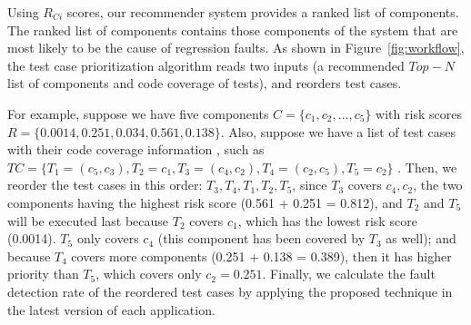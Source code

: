 Using $R_{Ci}$ scores, our recommender system provides a ranked list of components.
The ranked list of components contains those components of the system that are most
likely to be the cause of regression faults. 
As shown in Figure~\ref{fig:workflow}, the test case prioritization algorithm
reads two inputs (a recommended $Top-N$ list of components and code coverage of tests),
and reorders test cases. 

For example, suppose we have five components
$C =\{c_1, c_2, ... , c_5\}$ with risk scores 
$R =\{0.0014, 0.251, 0.034 , 0.561, 0.138\}$.
Also, suppose we have a list of test cases with their code coverage information
, such as $TC =\{T_1 ={(c_5, c_3)}, T_2={c_1}, T_3={(c_4, c_2)}, T_4={(c_2,c_5)} , T_5={c_2}\}$ .
Then, we reorder the test cases in this order:
$T_3, T_4, T_1, T_2, T_5$, 
since $T_3$ covers $c_4, c_2$, the two components 
having the highest risk score (0.561 + 0.251 = 0.812), and $T_2$ and $T_5$ will be
executed last because $T_2$ covers $c_1$, which has the lowest risk score (0.0014).
$T_5$ only covers $c_4$ (this component has been covered by $T_3$ as well); and because 
$T_4$  covers more components (0.251 + 0.138 = 0.389), then it has higher priority than 
$T_5$, which covers only $c_2 = 0.251$.
Finally, we calculate the fault detection rate of the reordered test cases by 
applying the proposed technique in the latest version of each application.  


